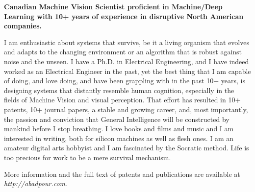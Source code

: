 \onehalfspace
\textbf{\large Canadian Machine Vision Scientist proficient in Machine/Deep Learning with 10+ years of experience in disruptive North American companies.}
\singlespace

\vspace{1cm}

I am enthusiastic about systems that survive, be it a living organism that evolves and adapts to the changing environment or an algorithm that is robust against noise and the unseen. I have a Ph.D. in Electrical Engineering, and I have indeed worked as an Electrical Engineer in the past, yet the best thing that I am capable of doing, and love doing, and have been grappling with in the past 10+ years, is designing systems that distantly resemble human cognition, especially in the fields of Machine Vision and visual perception. That effort has resulted in 10+ patents, 10+ journal papers, a stable and growing career, and, most importantly, the passion and conviction that General Intelligence will be constructed by mankind before I stop breathing. I love books and films and music and I am interested in writing, both for silicon machines as well as flesh ones. I am an amateur digital arts hobbyist and I am fascinated by the Socratic method. Life is too precious for work to be a mere survival mechanism.

\vspace{0.5cm}
More information and the full text of patents and publications are available at \emph{http://abadpour.com}.

\vspace{1.5cm}
